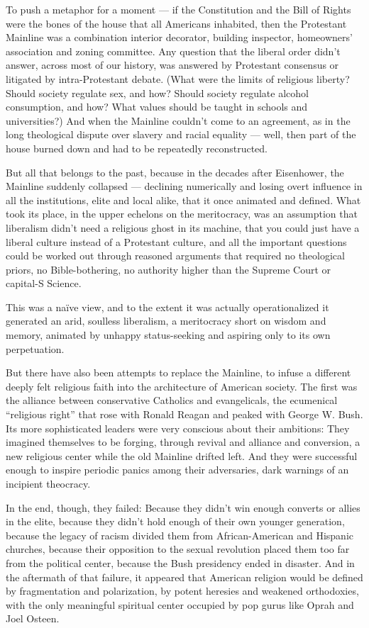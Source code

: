 To push a metaphor for a moment --- if the Constitution and the Bill of
Rights were the bones of the house that all Americans inhabited, then
the Protestant Mainline was a combination interior decorator, building
inspector, homeowners' association and zoning committee. Any question
that the liberal order didn't answer, across most of our history, was
answered by Protestant consensus or litigated by intra-Protestant
debate. (What were the limits of religious liberty? Should society
regulate sex, and how? Should society regulate alcohol consumption, and
how? What values should be taught in schools and universities?) And when
the Mainline couldn't come to an agreement, as in the long theological
dispute over slavery and racial equality --- well, then part of the
house burned down and had to be repeatedly reconstructed.

But all that belongs to the past, because in the decades after
Eisenhower, the Mainline suddenly collapsed --- declining numerically
and losing overt influence in all the institutions, elite and local
alike, that it once animated and defined. What took its place, in the
upper echelons on the meritocracy, was an assumption that liberalism
didn't need a religious ghost in its machine, that you could just have a
liberal culture instead of a Protestant culture, and all the important
questions could be worked out through reasoned arguments that required
no theological priors, no Bible-bothering, no authority higher than the
Supreme Court or capital-S Science.

This was a naïve view, and to the extent it was actually operationalized
it generated an arid, soulless liberalism, a meritocracy short on wisdom
and memory, animated by unhappy status-seeking and aspiring only to its
own perpetuation.

But there have also been attempts to replace the Mainline, to infuse a
different deeply felt religious faith into the architecture of American
society. The first was the alliance between conservative Catholics and
evangelicals, the ecumenical ``religious right'' that rose with Ronald
Reagan and peaked with George W. Bush. Its more sophisticated leaders
were very conscious about their ambitions: They imagined themselves to
be forging, through revival and alliance and conversion, a new religious
center while the old Mainline drifted left. And they were successful
enough to inspire periodic panics among their adversaries, dark warnings
of an incipient theocracy.

In the end, though, they failed: Because they didn't win enough converts
or allies in the elite, because they didn't hold enough of their own
younger generation, because the legacy of racism divided them from
African-American and Hispanic churches, because their opposition to the
sexual revolution placed them too far from the political center, because
the Bush presidency ended in disaster. And in the aftermath of that
failure, it appeared that American religion would be defined by
fragmentation and polarization, by potent heresies and weakened
orthodoxies, with the only meaningful spiritual center occupied by pop
gurus like Oprah and Joel Osteen.

